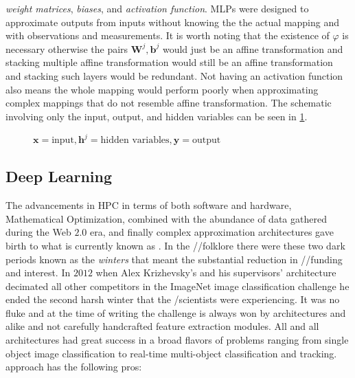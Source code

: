 \emph{weight matrices}, \emph{biases}, and \emph{activation function}. \ac{MLP}s were designed to approximate outputs from inputs without knowing the the actual mapping and with observations and measurements. 
It is worth noting that the existence of $\varphi$ is necessary otherwise the pairs $\boldsymbol{W}^j,\boldsymbol{b}^j$ would 
just be an affine transformation and stacking multiple affine transformation would still be an affine transformation and stacking 
such layers would be redundant. Not having an activation function also means the whole mapping would perform poorly when approximating 
complex mappings that do not resemble affine transformation. The schematic involving only the input, output, and hidden variables can be seen 
in \cref{fig:multi_layer_perceptron}.
\begin{figure}
  \centering
  \resizebox{0.7\textwidth}{!}{}
  \caption{$\boldsymbol{x} =\text{input},\boldsymbol{h}^j=\text{hidden variables},\boldsymbol{y}=\text{output}$}
  \label{fig:multi_layer_perceptron}
\end{figure}
\subsection{Deep Learning}
The advancements in \ac{HPC}\cite{Meuer} in terms of both software\cite{Dagum1998}\cite{1993}\cite{Nvidia} and 
hardware\cite{Patterson2014}\cite{Hennessy2019}\cite{Nvidia}, Mathematical Optimization\cite{Boyd2004}\cite{Nocedal2006}\cite{Sun2019}, 
\ad\cite{Naumann2011}\cite{Griewank2008} combined with the abundance of data gathered during the Web $2.0$ era, 
and finally complex approximation architectures gave birth to what is currently known as 
\dl\cite{LeCun2015}\cite{Higham2018}\cite{Berner2021}. In the \ml/\dl/\ai folklore there were these two dark 
periods known as the \emph{\ai winters} that meant the substantial reduction in \ml/\dl/\ai funding and 
interest. In $2012$ when Alex Krizhevsky's and his supervisors' \dl architecture \cite{Krizhevsky2017} decimated all other 
competitors in the ImageNet \cite{Deng2009} image classification challenge\cite{SVLL} he ended the second harsh winter 
that the \ml/\ai scientists were experiencing. It was no fluke and at the time of writing the challenge is 
always won by \dl architectures \cite{Szegedy2014}\cite{He2015}\cite{Simonyan2014} and alike and not carefully 
handcrafted feature extraction modules. All and all \dl architectures had great success in a broad flavors of 
problems ranging from single object image classification \cite{Rawat2017} to real-time multi-object classification and 
tracking\cite{Luo2021}. \DL approach has the following pros:

